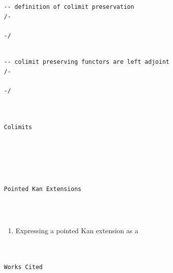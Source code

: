 \documentclass{book}
\theoremstyle{definition}
\newcounter{lcounter}
\renewcommand{\chapter}[1]{
\newpage
{
\Huge 
\begin{center}
\ \\
\ \\
\thispagestyle{empty}
\texttt{#1}
\end{center}}
\ \\
\ \\
}
\begin{document}
{{\begin{center}
\begin{tcolorbox}[width=5in,colback={white},title={\begin{center}\texttt{Lean \thelcounter} \addtocounter{lcounter}{1}  \end{center}},colbacktitle=Blue,coltitle=black]
\begin{verbatim}
-- definition of colimit preservation
/-

-/

\end{verbatim}
\end{tcolorbox}
\end{center}

\begin{center}
\begin{tcolorbox}[width=5in,colback={white},title={\begin{center}\texttt{Lean \thelcounter} \addtocounter{lcounter}{1}  \end{center}},colbacktitle=Blue,coltitle=black]
\begin{verbatim}

-- colimit preserving functors are left adjoint
/-

-/

\end{verbatim}
\end{tcolorbox}
\end{center}

\chapter{Colimits}

\chapter{Pointed Kan Extensions}

\begin{enumerate}
\item Expressing a pointed Kan extension as a 
\end{enumerate}





\newpage
{
\Huge 
\begin{center}
\ \\
\ \\
\texttt{Works Cited}
\ \\
\ \\
\end{center}
\thispagestyle{empty}
}

}}
\end{document}
